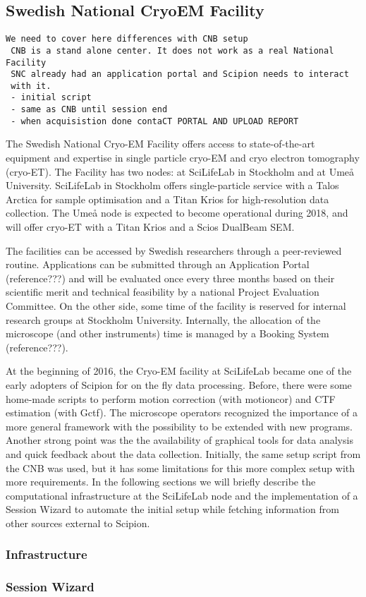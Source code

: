 
\subsection{Swedish National CryoEM Facility}

\begin{verbatim}
We need to cover here differences with CNB setup
 CNB is a stand alone center. It does not work as a real National Facility
 SNC already had an application portal and Scipion needs to interact
 with it. 
 - initial script
 - same as CNB until session end
 - when acquisistion done contaCT PORTAL AND UPLOAD REPORT
\end{verbatim}

The Swedish National Cryo-EM Facility offers access to state-of-the-art equipment and expertise 
in single particle cryo-EM and cryo electron tomography (cryo-ET). The Facility has two nodes: at SciLifeLab 
in Stockholm and at Umeå University. SciLifeLab in Stockholm offers single-particle service with a 
Talos Arctica for sample optimisation and a Titan Krios for high-resolution data collection. 
The Umeå node is expected to become operational during 2018, and will offer cryo-ET with a 
Titan Krios and a Scios DualBeam SEM.

The facilities can be accessed by Swedish researchers through a peer-reviewed routine. Applications can be 
submitted through an Application Portal (reference???) and will be evaluated once every three months based on their 
scientific merit and technical feasibility by a national Project Evaluation Committee. On the other side, 
some time of the facility is reserved for internal research groups at Stockholm University. Internally, the allocation
of the microscope (and other instruments) time is managed by a Booking System (reference???). 


At the beginning of 2016, the Cryo-EM facility at SciLifeLab became one of the early adopters of Scipion 
for on the fly data processing. Before, there were some home-made scripts to perform motion correction (with motioncor)
and CTF estimation (with Gctf). The microscope operators recognized the importance of  
a more general framework with the possibility to be extended with new programs. Another strong point was the 
the availability of graphical tools for data analysis and quick feedback about the data collection. Initially, the 
same setup script from the CNB was used, but it has some limitations for this more complex setup with more 
requirements. In the following sections we will briefly describe the computational infrastructure at the
SciLifeLab node and the implementation of a Session Wizard to automate the initial setup while fetching 
information from other sources external to Scipion. 


\subsubsection{Infrastructure}


\subsubsection{Session Wizard}

